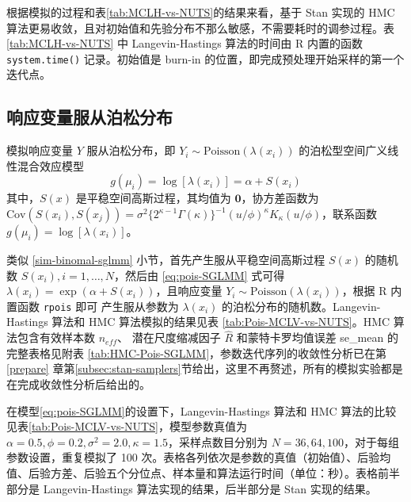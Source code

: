 \documentclass[12pt,a4paper,UTF8,twoside]{book}
\theoremstyle{definition}
\theoremstyle{definition}
\theoremstyle{definition}
\theoremstyle{remark}
\begin{document}
根据模拟的过程和表\ref{tab:MCLH-vs-NUTS}的结果来看，基于 Stan 实现的 HMC
算法更易收敛，且对初始值和先验分布不那么敏感，不需要耗时的调参过程。表
\ref{tab:MCLH-vs-NUTS} 中 Langevin-Hastings 算法的时间由 R 内置的函数
\texttt{system.time()} 记录。初始值是 burn-in
的位置，即完成预处理开始采样的第一个迭代点。

\hypertarget{possion-sglmm}{%
\subsection{响应变量服从泊松分布}\label{possion-sglmm}}

模拟响应变量 \(Y\) 服从泊松分布，即
\(Y_i \sim \mathrm{Poisson}(\lambda(x_{i}))\)
的泊松型空间广义线性混合效应模型 \begin{equation}
g(\mu_i) = \log[\lambda(x_i)] = \alpha + S(x_i) \label{eq:pois-SGLMM}
\end{equation} \noindent 其中，\(S(x)\) 是平稳空间高斯过程，其均值为
\(\mathbf{0}\)，协方差函数为
\(\mathrm{Cov}(S(x_i),S(x_j)) = \sigma^2 \big\{2^{\kappa-1}\Gamma(\kappa)\big\}^{-1}(u/\phi)^{\kappa}K_{\kappa}(u/\phi)\)，联系函数
\(g(\mu_i) = \log[\lambda(x_{i})]\)。

类似 \ref{sim-binomal-sglmm} 小节，首先产生服从平稳空间高斯过程 \(S(x)\)
的随机数 \(S(x_i),i=1,\ldots,N\)，然后由 \eqref{eq:pois-SGLMM} 式可得
\(\lambda(x_i) = \exp(\alpha + S(x_i))\)，且响应变量
\(Y_i \sim \mathrm{Poisson}(\lambda(x_{i}))\)，根据 R 内置函数
\texttt{rpois} 即可 产生服从参数为 \(\lambda(x_i)\)
的泊松分布的随机数。Langevin-Hastings 算法和 HMC 算法模拟的结果见表
\ref{tab:Pois-MCLV-vs-NUTS}。HMC 算法包含有效样本数 \(n_{eff}\)、
潜在尺度缩减因子 \(\hat{R}\) 和蒙特卡罗均值误差 se\_mean
的完整表格见附表
\ref{tab:HMC-Pois-SGLMM}，参数迭代序列的收敛性分析已在第\ref{prepare}
章第\ref{subsec:stan-samplers}节给出，这里不再赘述，所有的模拟实验都是在完成收敛性分析后给出的。

在模型\eqref{eq:pois-SGLMM}的设置下，Langevin-Hastings 算法和 HMC
算法的比较见表\ref{tab:Pois-MCLV-vs-NUTS}，模型参数真值为
\(\alpha = 0.5, \phi = 0.2, \sigma^2 = 2.0, \kappa = 1.5\)，采样点数目分别为
\(N=36,64,100\)，对于每组参数设置，重复模拟了 100
次。表格各列依次是参数的真值（初始值）、后验均值、后验方差、后验五个分位点、样本量和算法运行时间（单位：秒）。表格前半部分是
Langevin-Hastings 算法实现的结果，后半部分是 Stan 实现的结果。
\end{document}
